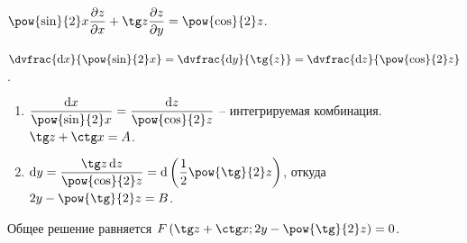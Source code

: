 \documentclass[a5paper,10pt]{article}
\begin{document}
    $\pow{\sin}{2} x \parder{z} {x} + \tg z \parder{z} {y} = \pow{\cos}{2} z$.

    $\dvfrac {\di x} {\pow{\sin}{2} x} 
    = \dvfrac {\di y} {\vphantom{\pow{\sin}{2}}\tg{z}} 
    = \dvfrac {\di z}{\pow{\cos}{2} z}$.
        
    \begin{enumerate}
        \item $\dfrac {\di x} {\pow{\sin}{2} x} 
        = \dfrac {\di z} {\pow{\cos}{2} z}$
        -- интегрируемая комбинация.
        $\tg z + \ctg x = A$.
        
        \item $\di y = \dfrac {\tg z \di z} {\pow{\cos}{2} z} 
        = \di\br{\dfrac{1}{2} \pow{\tg}{2} z}$,
        откуда
        $2y - \pow{\tg}{2} z = B$.
    \end{enumerate}
    
    Общее решение равняется 
    $F\br{\tg z + \ctg x; 2y - \pow{\tg}{2} z} = 0$.
\end{document}
